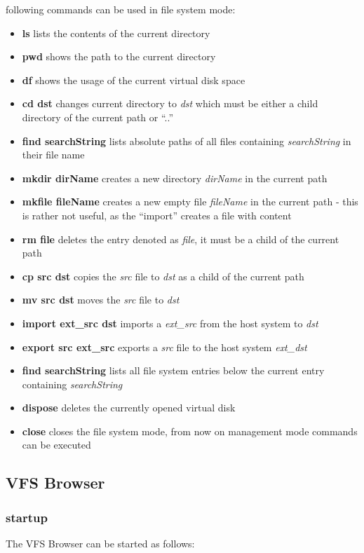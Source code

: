 following commands can be used in file system mode:

\begin{itemize}
  \item {\textbf{ls}} lists the contents of the current directory
  \item {\textbf{pwd}} shows the path to the current directory
  \item {\textbf{df}} shows the usage of the current virtual disk space
  \item {\textbf{cd dst}} changes current directory to \textit{dst} which must
  be either a child directory of the current path or ``..''
  \item {\textbf{find searchString}} lists absolute paths of all files
  containing \textit{searchString} in their file name
  \item {\textbf{mkdir dirName}} creates a new directory \textit{dirName} in the
  current path
  \item {\textbf{mkfile fileName}} creates a new empty file \textit{fileName} in
  the current path - this is rather not useful, as the ``import'' creates a
  file with content
  \item {\textbf{rm file}} deletes the entry denoted as \textit{file}, it must
  be a child of the current path
  \item {\textbf{cp src dst}} copies the \textit{src} file to \textit{dst} as a
  child of the current path
  \item {\textbf{mv src dst}} moves the \textit{src} file to \textit{dst}
  \item {\textbf{import ext\_src dst}} imports a \textit{ext\_src} from the
  host system to \textit{dst}
  \item {\textbf{export src ext\_src}} exports a \textit{src} file to the host
  system \textit{ext\_dst}
  \item {\textbf{find searchString}} lists all file system entries below the
  current entry containing \textit{searchString}
  \item {\textbf{dispose}} deletes the currently opened virtual disk
  \item {\textbf{close}} closes the file system mode, from now on management mode
  commands can be executed
\end{itemize}


\subsection{VFS Browser}
\subsubsection{startup}
The VFS Browser  can be started as follows:

